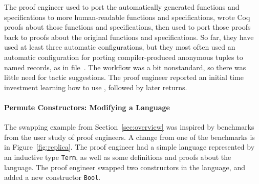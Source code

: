 The proof engineer used \toolnamec to port the automatically generated functions and specifications to more
human-readable functions and specifications, wrote Coq proofs about those functions and specifications, then
used \toolnamec to port those proofs back to
proofs about the original functions and specifications.
So far, they have used at least three automatic configurations,
but they most often used an automatic configuration for porting compiler-produced anonymous tuples
to named records, as in file~\href{https://github.com/Ptival/saw-core-coq/tree/dump-wip}{}. %
The workflow was a bit nonstandard,
so there was little need for tactic suggestions.
The proof engineer reported an initial time investment learning how to use \toolnamec,
followed by later returns.

\paragraph{Permute Constructors: Modifying a Language}
The swapping example from Section~\ref{sec:overview} was inspired by benchmarks 
from the  user study of proof engineers.
A change from one of the benchmarks is in Figure~\ref{fig:replica}.
The proof engineer had a simple language represented by an inductive type \lstinline{Term},
as well as some definitions and proofs about the language.
The proof engineer swapped two constructors in the language,
and added a new constructor \lstinline{Bool}.

